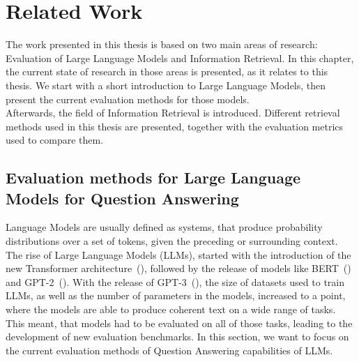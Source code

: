 \chapter{Related Work}\label{related-work}
The work presented in this thesis is based on two main areas of research: Evaluation of Large Language Models and Information Retrieval.
In this chapter, the current state of research in those areas is presented, as it relates to this thesis.
We start with a short introduction to Large Language Models, then present the current evaluation methods for those models.
\\
Afterwards, the field of Information Retrieval is introduced.
Different retrieval methods used in this thesis are presented, together with the evaluation metrics used to compare them.

\section{Evaluation methods for Large Language Models for Question Answering}\label{evaluation-of-large-language-models}
Language Models are usually defined as systems, that produce probability distributions over a set of tokens, given the preceding or surrounding context.
The rise of Large Language Models (LLMs), started with the introduction of the new Transformer architecture~(\cite{vaswani:2017}), followed by the release of models like BERT~(\cite{devlin:2018}) and GPT-2~(\cite{radford:2018}).
With the release of GPT-3~(\cite{brown:2020}), the size of datasets used to train LLMs, as well as the number of parameters in the models, increased to a point, where the models are able to produce coherent text on a wide range of tasks.
This meant, that models had to be evaluated on all of those tasks, leading to the development of new evaluation benchmarks.
In this section, we want to focus on the current evaluation methods of Question Answering capabilities of LLMs.


